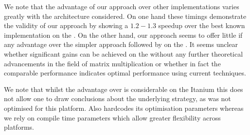 We note that the advantage of our approach over other implementations varies greatly with the architecture considered. On one hand these timings demonstrate the validity of our approach by showing a $1.2 - 1.3$ speedup over the best known implementation on the \CTD. On the other hand, our approach seems to offer little if any advantage over the simpler approach followed by \Magma on the \Opteron. It seems unclear whether significant gains can be achieved on the \Opteron without any further theoretical advancements in the field of matrix multiplication or whether in fact the comparable performance indicates optimal performance using current techniques.

We note that whilst the advantage over \Magma is considerable on the Itanium this does not allow one to draw conclusions about the underlying strategy, as \Magma was not optimised for this platform. Also \Magma hardcodes its optimisation parameters whereas we rely on compile time parameters which allow  greater flexibility across platforms.
